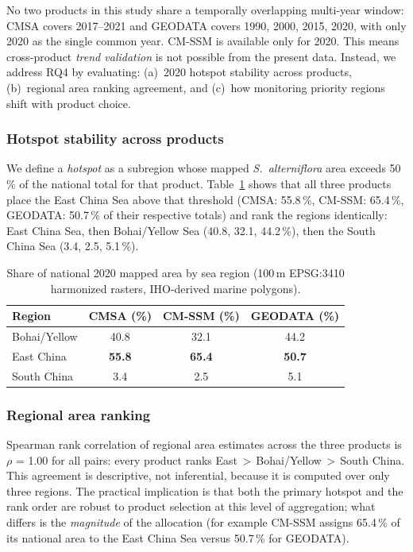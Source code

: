 \documentclass[11pt]{article}
\begin{document}
No two products in this study share a temporally overlapping multi-year window:
CMSA covers 2017--2021 and GEODATA covers 1990, 2000, 2015, 2020, with only 2020
as the single common year. CM-SSM is available only for 2020. This means
cross-product \emph{trend validation} is not possible from the present data.
Instead, we address RQ4 by evaluating: (a)~2020 hotspot stability across
products, (b)~regional area ranking agreement, and (c)~how monitoring priority
regions shift with product choice.

\subsubsection{Hotspot stability across products}

We define a \textit{hotspot} as a subregion whose mapped \textit{S.~alterniflora}
area exceeds 50\,\% of the national total for that product.
Table~\ref{tab:hotspots} shows that all three products place the East China
Sea above that threshold (CMSA: 55.8\,\%, CM-SSM: 65.4\,\%, GEODATA:
50.7\,\% of their respective totals) and rank the regions identically:
East China Sea, then Bohai/Yellow Sea (40.8, 32.1, 44.2\,\%), then the
South China Sea (3.4, 2.5, 5.1\,\%).

\begin{table}[htpb]
\centering
\caption{\label{tab:hotspots}Share of national 2020 mapped area by sea region
  (100\,m EPSG:3410 harmonized rasters, IHO-derived marine polygons).}
\begin{tabular}{l c c c}
\toprule
Region & CMSA (\%) & CM-SSM (\%) & GEODATA (\%) \\
\midrule
Bohai/Yellow & 40.8 & 32.1 & 44.2 \\
East China   & \textbf{55.8} & \textbf{65.4} & \textbf{50.7} \\
South China  & 3.4 & 2.5 & 5.1 \\
\bottomrule
\end{tabular}
\end{table}

\subsubsection{Regional area ranking}

Spearman rank correlation of regional area estimates across the three products
is $\rho$ = 1.00 for all pairs: every product ranks
East\,$>$\,Bohai/Yellow\,$>$\,South China. This agreement is descriptive, not
inferential, because it is computed over only three regions. The practical
implication is that both the primary hotspot and the rank order are robust to
product selection at this level of aggregation; what differs is the
\emph{magnitude} of the allocation (for example CM-SSM assigns 65.4\,\% of its
national area to the East China Sea versus 50.7\,\% for GEODATA).
\end{document}
